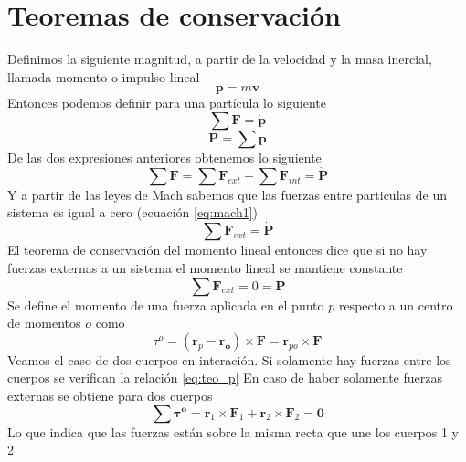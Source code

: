 \documentclass[a4paper]{article}
\numberwithin{equation}{section}
\begin{document}
\section{Teoremas de conservación}
	Definimos la siguiente magnitud, a partir de la velocidad y la masa inercial, llamada momento o impulso lineal
	\begin{equation}
		\boldsymbol{p} = m \boldsymbol{v}
	\end{equation}
	Entonces podemos definir para una partícula lo siguiente
	\begin{equation}
		\sum \boldsymbol{F} = \dot{\boldsymbol{p}}
	\end{equation}
	\begin{equation}
		\boldsymbol{P} = \sum \boldsymbol{p}
	\end{equation}
	De las dos expresiones anteriores obtenemos lo siguiente
	\begin{equation}
		\sum \boldsymbol{F} = \sum \boldsymbol{F}_{ext} + \sum \boldsymbol{F}_{int} = \dot{\boldsymbol{P}} 
	\end{equation}
	Y a partir de las leyes de Mach sabemos que las fuerzas entre particulas de un sistema es igual a cero (ecuación \ref{eq:mach1})
	\begin{equation}
		\sum \boldsymbol{F}_{ext} = \dot{\boldsymbol{P}} \label{eq:newton_sistemas} 
	\end{equation}
	El teorema de conservación del momento lineal entonces dice que si no hay fuerzas externas a un sistema el momento lineal se mantiene constante
	\begin{equation}
		\sum \boldsymbol{F}_{ext} = 0 = \dot{\boldsymbol{P}} \label{eq:teo_p}
	\end{equation}
	Se define el momento de una fuerza aplicada en el punto $p$ respecto a un centro de momentos $o$ como
	\begin{equation}
		\tau^{o} = (\boldsymbol{r}_p - \boldsymbol{r_o}) \times \boldsymbol{F} = \boldsymbol{r}_{po} \times \boldsymbol{F} \label{eq:momento_fuerza}
	\end{equation}
	Veamos el caso de dos cuerpos en interación. Si solamente hay fuerzas entre los cuerpos se verifican la relación \ref{eq:teo_p}
	En caso de haber solamente fuerzas externas se obtiene para dos cuerpos
	\begin{equation}
		\sum \boldsymbol{\tau^{o}} = \boldsymbol{r}_1 \times \boldsymbol{F}_1 + \boldsymbol{r}_2 \times \boldsymbol{F}_2  = \boldsymbol{0}
	\end{equation}
	Lo que indica que las fuerzas están sobre la misma recta que une los cuerpos 1 y 2
\end{document}
